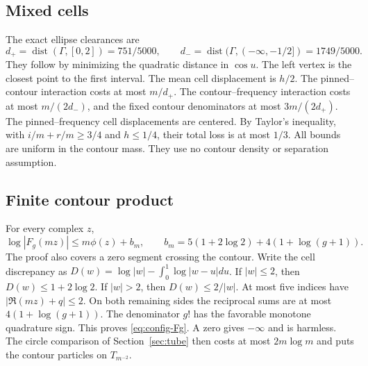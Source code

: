 \subsection{Mixed cells}
The exact ellipse clearances are
\[
 d_+=\operatorname{dist}(\Gamma,[0,2])=751/5000,
 \qquad d_-=\operatorname{dist}(\Gamma,(-\infty,-1/2])=1749/5000.
\]
They follow by minimizing the quadratic distance in \(\cos u\). The left
vertex is the closest point to the first interval. The mean cell
displacement is \(h/2\). The pinned--contour interaction costs at most
\(m/d_+\). The contour--frequency interaction costs at most \(m/(2d_-)\),
and the fixed contour denominators at most \(3m/(2d_+)\). The
pinned--frequency cell displacements are centered. By Taylor's inequality,
with \(i/m+r/m\ge3/4\) and \(h\le1/4\), their total loss is at most
\(1/3\). All bounds are uniform in the contour mass. They use no contour
density or separation assumption.

\subsection{Finite contour product}
For every complex \(z\),
\begin{equation}\label{eq:config-Fg}
 \log|F_g(mz)|\le m\phi(z)+b_m,\qquad
 b_m=5(1+2\log2)+4(1+\log(g+1)).
\end{equation}
The proof also covers a zero segment crossing the contour. Write the cell
discrepancy as \(D(w)=\log|w|-\int_0^1\log|w-u|du\). If \(|w|\le2\), then
\(D(w)\le1+2\log2\). If \(|w|>2\), then \(D(w)\le2/|w|\). At most five
indices have \(|\Re(mz)+q|\le2\). On both remaining sides the reciprocal
sums are at most \(4(1+\log(g+1))\). The denominator \(g!\) has the
favorable monotone quadrature sign. This proves \eqref{eq:config-Fg}. A
zero gives \(-\infty\) and is harmless. The circle comparison of
Section~\ref{sec:tube} then costs at most \(2m\log m\) and puts the contour
particles on \(T_{m^{-2}}\).

